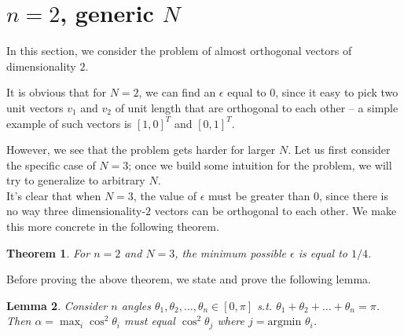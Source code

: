 \documentclass[11pt,letterpaper,twoside,english]{article}
\theoremstyle{theorem}
\newtheorem{theorem}{Theorem}[section]
\newtheorem{lemma}[theorem]{Lemma}
\theoremstyle{remark}
\begin{document}
\section{$n=2$, generic $N$}
In this section, we consider the problem of almost orthogonal vectors of dimensionality $2$.

It is obvious that for $N=2$, we can find an $\epsilon$ equal to $0$, since it easy to pick two unit vectors $v_1$ and $v_2$ of unit length that are orthogonal to each other -- a simple example of such vectors is $[1, 0]^T$ and $[0, 1]^T$. 

However, we see that the problem gets harder for larger $N$. Let us first consider the specific case of $N=3$; once we build some intuition for the problem, we will try to generalize to arbitrary $N$.
\\

It's clear that when $N=3$, the value of $\epsilon$ must be greater than $0$, since there is no way three dimensionality-$2$ vectors can be orthogonal to each other. We make this more concrete in the following theorem.

\begin{theorem}
For $n=2$ and $N=3$, the minimum possible $\epsilon$ is equal to $1/4$.
\end{theorem}

Before proving the above theorem, we state and prove the following lemma.

\begin{lemma}
Consider $n$ angles $\theta_1, \theta_2, \ldots, \theta_n \in [0, \pi]$ s.t. $\theta_1 + \theta_2 + \ldots + \theta_n = \pi$. Then $\alpha = \max_i \cos^2 \theta_i$ must equal $\cos^2 \theta_j$ where $j = \text{argmin }\theta_i$.
\end{lemma}
\end{document}
